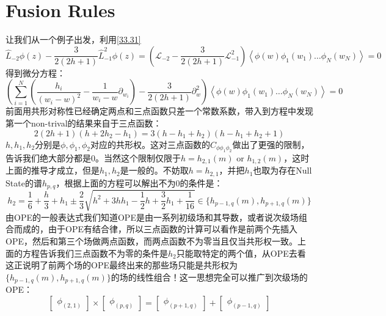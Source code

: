 \section{Fusion Rules}
让我们从一个例子出发，利用\ref{33.31}
\begin{equation}
	\widehat{L}_{-2}\left.\phi(z)-\frac3{2\left(2h+1\right)}\widehat{L}_{-1}^2\right.\phi(z)=\left(\mathcal{L}_{-2}-\frac3{2\left(2h+1\right)}\mathcal{L}_{-1}^2\right)\left\langle\phi(w)\left.\phi_1(w_1)\ldots\phi_N(w_N)\right\rangle\right. =0
\end{equation}
得到微分方程：
\begin{equation}\label{37.2}
	\boxed{
		\left(\sum_{i=1}^N\left(\frac{h_i}{(w_i-w)^2}-\frac{1}{w_i-w}\partial_{w_i}\right)-\frac{3}{2(2h+1)}\partial_w^2\right)\left\langle\phi(w)\phi_1(w_1)\ldots\phi_N(w_N)\right\rangle=0
	}
\end{equation}
前面用共形对称性已经确定两点和三点函数只差一个常数系数，带入到方程中发现第一个non-trival的结果来自于三点函数：
\begin{equation}
	2\left(2h+1\right)\left(h+2h_2-h_1\right)=3\left(h-h_1+h_2\right)\left(h-h_1+h_2+1\right)
\end{equation}
$h,h_1,h_2$分别是$\phi,\phi_1,\phi_2$对应的共形权。这对三点函数的$C_{\phi\phi_1\phi_2}$做出了更强的限制，告诉我们绝大部分都是0。当然这个限制仅限于$h=h_{2,1}(m) \text{ or } h_{1,2}(m)$，这时上面的推导才成立，但是$h_1,h_2$是一般的。不妨取$h=h_{2,1}$，并把$h_1$也取为存在Null State的谱$h_{p,q}$，根据上面的方程可以解出不为0的条件是：
\begin{equation}
	h_2=\frac16+\frac h3+h_1\pm\frac23\sqrt{h^2+3hh_1-\frac12h+\frac32h_1+\frac1{16}}\in\{h_{p-1,q}(m),h_{p+1,q}(m)\}
\end{equation}
由OPE的一般表达式我们知道OPE是由一系列初级场和其导数，或者说次级场组合而成的，由于OPE有结合律，所以三点函数的计算可以看作是前两个先插入OPE，然后和第三个场做两点函数，而两点函数不为零当且仅当共形权一致。上面的方程告诉我们三点函数不为零的条件是$h_2$只能取特定的两个值，从OPE去看这正说明了前两个场的OPE最终出来的那些场只能是共形权为$\{h_{p-1,q}(m),h_{p+1,q}(m)\}$的场的线性组合！这一思想完全可以推广到次级场的OPE：
\begin{equation}
	\begin{bmatrix}\phi_{(2,1)}\end{bmatrix}\times\begin{bmatrix}\phi_{(p,q)}\end{bmatrix}=\begin{bmatrix}\phi_{(p+1,q)}\end{bmatrix}+\begin{bmatrix}\phi_{(p-1,q)}\end{bmatrix}
\end{equation}
